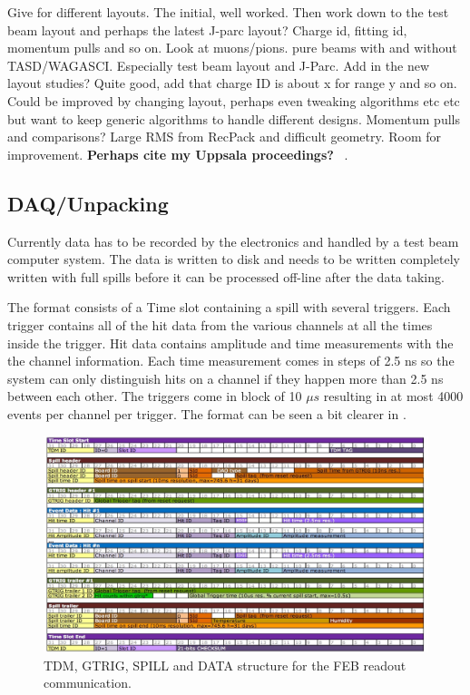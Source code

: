 Give for different layouts. The initial, well worked. Then work down to the test beam layout and perhaps the latest J-parc layout? 
Charge id, fitting id, momentum pulls and so on.
Look at muons/pions. pure beams with and without TASD/WAGASCI. Especially test beam layout and J-Parc.
Add in the new layout studies?
Quite good, add that charge ID is about x for range y and so on.  Could be improved by changing layout, perhaps even tweaking algorithms etc etc but want to keep generic algorithms to handle different designs.
Momentum pulls and comparisons? Large RMS from RecPack and difficult geometry. Room for improvement.
\textbf{Perhaps cite my Uppsala proceedings?} ~\cite{82Uppsala}.
\fi

\subsection{DAQ/Unpacking}


Currently data has to be recorded by the electronics and handled by a test beam computer system. The data is written to disk and needs to be written completely written with full spills before it can be processed off-line after the data taking.

The format consists of a Time slot containing a spill with several triggers. Each trigger contains all of the hit data from the various channels at all the times inside the trigger. Hit data contains amplitude and time measurements with the the channel information.
Each time measurement comes in steps of 2.5 ns so the system can only distinguish hits on a channel if they happen more than 2.5 ns between each other. The triggers come in block of 10 $\mu s$ resulting in at most 4000 events per channel per trigger. The format can be seen a bit clearer in .


\begin{figure}[h!]
\centering
\includegraphics[width=\textwidth]{figures/febstructure.jpeg}
\caption{TDM, GTRIG, SPILL and DATA structure for the FEB readout communication.}
\label{fig:FEBstructure}
\end{figure}

